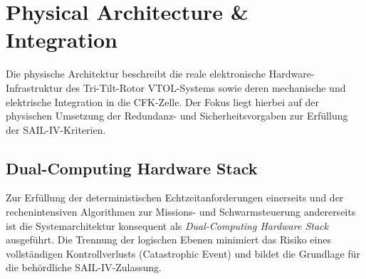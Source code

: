 
\section{Physical Architecture \& Integration}
\label{sec:physical_architecture}

Die physische Architektur beschreibt die reale elektronische Hardware-Infrastruktur des Tri-Tilt-Rotor VTOL-Systems sowie deren mechanische und elektrische Integration in die CFK-Zelle. 
Der Fokus liegt hierbei auf der physischen Umsetzung der Redundanz- und Sicherheitsvorgaben zur Erfüllung der SAIL-IV-Kriterien.

\subsection{Dual-Computing Hardware Stack}
Zur Erfüllung der deterministischen Echtzeitanforderungen einerseits und der rechenintensiven Algorithmen zur Missions- und Schwarmsteuerung andererseits ist die Systemarchitektur konsequent als 
\textit{Dual-Computing Hardware Stack} ausgeführt. Die Trennung der logischen Ebenen minimiert das Risiko eines vollständigen Kontrollverlusts (Catastrophic Event) und bildet die Grundlage für die behördliche SAIL-IV-Zulassung.

